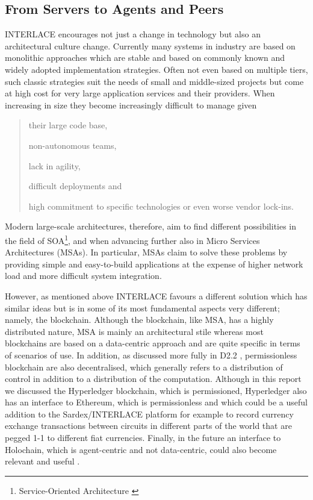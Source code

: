 \subsection{From Servers to Agents and Peers}

INTERLACE encourages not just a change in technology but also an architectural culture change. Currently many systems in industry are based on monolithic approaches which are stable and based on commonly known and widely adopted implementation strategies. Often not even based on multiple tiers, such classic strategies suit the needs of small and middle-sized projects but come at high cost for very large application services and their providers. When increasing in size they become increasingly difficult to manage given
\begin{quote}
\begin{packed_item1}
	\item their large code base,
	\item non-autonomous teams,
	\item lack in agility,
	\item difficult deployments and
	\item high commitment to specific technologies or even worse vendor lock-ins.
\end{packed_item1}
\end{quote}

Modern large-scale architectures, therefore, aim to find different possibilities in the field of SOA\footnote{Service-Oriented Architecture \cite{erl2014next}}, and when advancing further also in Micro Services Architectures (MSAs). In particular, MSAs \cite{newman2015building} claim to solve these problems by providing simple and easy-to-build applications at the expense of higher network load and more difficult system integration.

However, as mentioned above INTERLACE favours a different solution which has similar ideas but is in some of its most fundamental aspects very different; namely, the blockchain. Although the blockchain, like MSA, has a highly distributed nature, MSA is mainly an architectural stile whereas most blockchains are based on a data-centric approach and are quite specific in terms of scenarios of use. In addition, as discussed more fully in D2.2 \cite{INTERLACE_D22}, permissionless blockchain are also decentralised, which generally refers to a distribution of control in addition to a distribution of the computation. Although in this report we discussed the Hyperledger blockchain, which is permissioned, Hyperledger also has an interface to Ethereum, which is permissionless and which could be a useful addition to the Sardex/INTERLACE platform for example to record currency exchange transactions between circuits in different parts of the world that are pegged 1-1 to different fiat currencies. Finally, in the future an interface to Holochain, which is agent-centric and not data-centric, could also become relevant and useful \cite{INTERLACE_D22,INTERLACE_D23}.

